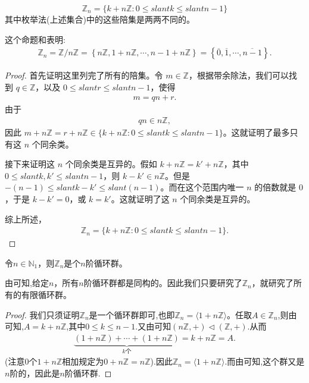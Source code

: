 \documentclass[../../main.tex]{subfiles}
\begin{document}
\begin{proposition}\label{proposition:枚举Z_n的所有元素}
\[
\mathbb{Z}_n = \{k + n\mathbb{Z} : 0\leqslant slant k\leqslant slant n - 1\}
\]
其中枚举法(上述集合)中的这些陪集是两两不同的。
\end{proposition}
\begin{note}
这个命题和表明:
\begin{align*}
\mathbb{Z} _n=\mathbb{Z} /n\mathbb{Z} =\left\{ n\mathbb{Z} ,1+n\mathbb{Z} ,\cdots ,n-1+n\mathbb{Z} \right\} =\left\{ \overline{0},\overline{1},\cdots ,\overline{n-1} \right\} .
\end{align*}
\end{note}
\begin{proof}
首先证明这里列完了所有的陪集。令 $m\in\mathbb{Z}$，根据带余除法，我们可以找到 $q\in\mathbb{Z}$，以及 $0\leqslant slant r\leqslant slant n - 1$，使得
\begin{align*}
m = qn + r .
\end{align*}
由于
\begin{align*}
qn\in n\mathbb{Z},
\end{align*}
因此 $m + n\mathbb{Z}=r + n\mathbb{Z}\in\{k + n\mathbb{Z} : 0\leqslant slant k\leqslant slant n - 1\}$。这就证明了最多只有这 $n$ 个同余类。

接下来证明这 $n$ 个同余类是互异的。假如 $k + n\mathbb{Z}=k' + n\mathbb{Z}$，其中 $0\leqslant slant k,k'\leqslant slant n - 1$，则 $k - k'\in n\mathbb{Z}$。但是 $-(n - 1)\leqslant slant k - k'\leqslant slant (n - 1)$。而在这个范围内唯一 $n$ 的倍数就是 $0$，于是 $k - k' = 0$，或 $k = k'$。这就证明了这 $n$ 个同余类是互异的。

综上所述，
\begin{align*}
\mathbb{Z}_n = \{k + n\mathbb{Z} : 0\leqslant slant k\leqslant slant n - 1\}.
\end{align*} 
\end{proof}

\begin{proposition}
令$n \in \mathbb{N}_1$，则$\mathbb{Z}_n$是个$n$阶循环群。  
\end{proposition}
\begin{note}
由可知,给定$n$，所有$n$阶循环群都是同构的。因此我们只要研究了$\mathbb{Z}_n$，就研究了所有的有限循环群。 
\end{note}
\begin{proof}
我们只须证明$\mathbb{Z}_n $是一个循环群即可,也即$\mathbb{Z}_n = \langle 1 + n\mathbb{Z} \rangle$。任取$A\in \mathbb{Z}_n$,则由可知,$A=k+n\mathbb{Z}$,其中$0\leqslant  k\leqslant  n-1$.又由可知$(n\mathbb{Z},+)\lhd (\mathbb{Z},+)$.从而
\begin{align*}
\underset{k\text{个}}{\underbrace{\left( 1+n\mathbb{Z} \right) +\cdots +\left( 1+n\mathbb{Z} \right) }}=k+n\mathbb{Z} =A.
\end{align*}
(注意$0$个$1 + n\mathbb{Z}$相加规定为$0 + n\mathbb{Z} = n\mathbb{Z}$).因此$\mathbb{Z}_n = \langle 1 + n\mathbb{Z} \rangle$.而由可知,这个群又是$n$阶的，因此是$n$阶循环群.
\end{proof}
\end{document}
